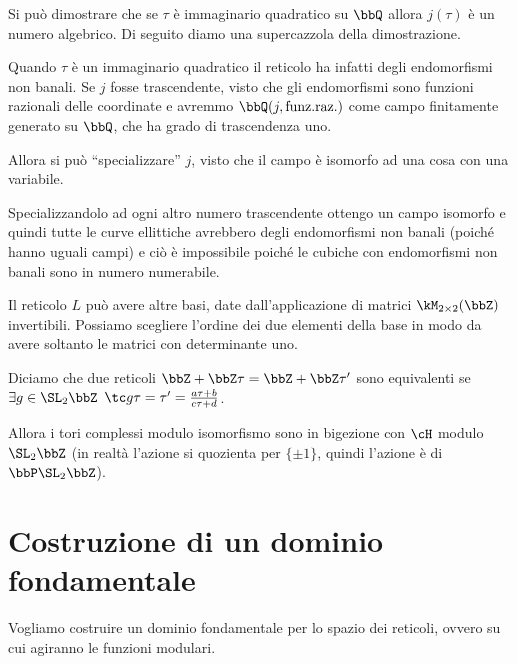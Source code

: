 \begin{divagazione}
  Si può dimostrare che se $\tau$ è immaginario quadratico su $\bbQ$ allora
  $j(\tau)$ è un numero algebrico. Di seguito diamo una supercazzola della dimostrazione.

  Quando $\tau$ è un immaginario quadratico il reticolo ha infatti degli
  endomorfismi non banali. Se $j$ fosse trascendente, visto che gli
  endomorfismi sono funzioni razionali delle coordinate e avremmo
  $\bbQ(j, \text{funz.raz.})$ come campo finitamente generato su $\bbQ$,
  che ha grado di trascendenza uno.

  Allora si può ``specializzare'' $j$, visto che il campo è isomorfo ad
  una cosa con una variabile.

  
  Specializzandolo ad ogni altro numero trascendente ottengo un campo
  isomorfo e quindi tutte le curve ellittiche avrebbero degli
  endomorfismi non banali (poiché hanno uguali campi) e ciò è
  impossibile poiché le cubiche con endomorfismi non banali sono in numero
  numerabile.
\end{divagazione}

Il reticolo $L$ può avere altre basi, date dall'applicazione di matrici
$\kM_{2 \times 2} (\bbZ)$ invertibili. Possiamo scegliere l'ordine dei
due elementi della base in modo da avere soltanto le matrici con
determinante uno.

Diciamo che due reticoli $\bbZ + \bbZ \tau = \bbZ + \bbZ \tau'$ sono
equivalenti se $\exists g \in \SL_2 \bbZ$
$\tc g\tau = \tau' = \frac{a \tau + b}{c \tau + d}$.

Allora i tori complessi modulo isomorfismo sono in bigezione con $\cH$
modulo $\SL_2 \bbZ$ (in realtà l'azione si quozienta per $\{\pm 1\}$,
quindi l'azione è di $\bbP\SL_2 \bbZ$).

\section{Costruzione di un dominio fondamentale}

Vogliamo costruire un dominio fondamentale per lo spazio dei reticoli,
ovvero su cui agiranno le funzioni modulari.


